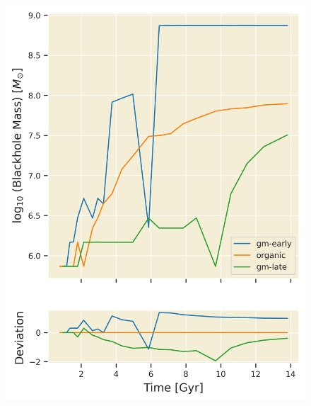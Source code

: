 \documentclass[twocolumn]{article}
\begin{document}
	
	\begin{figure}
			\centering 
			\includegraphics[width=\columnwidth]{./BH_mass.png}
	\end{figure}
\end{document}
